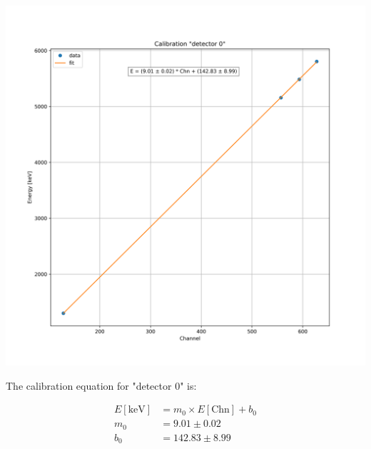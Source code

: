 \documentclass{article}
\begin{document}
\begin{multicols}{2}
\begin{center}
    \label{TT_21}
    \centering
    \includegraphics[scale = 0.35]{../../images/Chn0_calib_with_Backscattering.png}
\end{center}

The calibration equation for "detector 0" is:

\begin{equation}
    \begin{split}
        E[\text{keV}] &= m_0 \times E[\text{Chn}] + b_0 \\
        m_0 &= 9.01 \pm 0.02 \\
        b_0 &= 142.83 \pm 8.99
    \end{split}
    \label{eq:calib0}
\end{equation}


\end{multicols}
\end{document}
